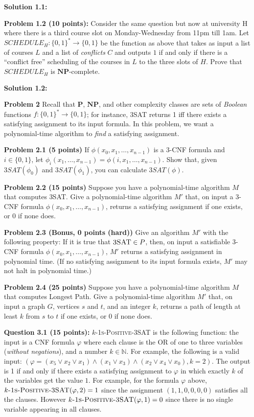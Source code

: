 \documentclass[11pt]{article}
\begin{document}
\textbf{Solution 1.1:}

\textbf{Problem 1.2 (10 points):} Consider the same question but now at
university H where there is a third course slot on Monday-Wednesday from
11pm till 1am. Let \(SCHEDULE_H:\{0,1\}^* \rightarrow \{0,1\}\) be the
function as above that takes as input a list of courses \(L\) and a list
of \emph{conflicts} \(C\) and outputs \(1\) if and only if there is a
``conflict free'' scheduling of the courses in \(L\) to the three slots
of \(H\). Prove that \(SCHEDULE_H\) is \(\mathbf{NP}\)-complete.

\textbf{Solution 1.2:}



\textbf{Problem 2} Recall that $\mathbf{P}$, $\mathbf{NP}$, and other complexity classes are sets of \emph{Boolean} functions $f: \{0,1\}^* \to \{0,1\}$; for instance, 3SAT returns 1 iff there exists a satisfying assignment to its input formula. In this problem, we want a polynomial-time algorithm to \emph{find} a satisfying assignment.

\textbf{Problem 2.1 (5 points)} If $\phi(x_0, x_1, \ldots, x_{n-1})$ is a 3-CNF formula and $i \in \{0,1\}$, let $\phi_i(x_1, \ldots, x_{n-1}) = \phi(i,x_1, \ldots, x_{n-1})$. Show that, given $3SAT(\phi_0)$ and $3SAT(\phi_1)$, you can calculate $3SAT(\phi)$.

\textbf{Problem 2.2 (15 points)} Suppose you have a polynomial-time algorithm $M$ that computes \textsc{3SAT}. Give a polynomial-time algorithm $M'$ that, on input a 3-CNF formula $\phi(x_0, x_1, \ldots, x_{n-1})$, returns a satisfying assignment if one exists, or 0 if none does.

\textbf{Problem 2.3 (Bonus, 0 points (hard))} Give an algorithm $M'$ with the following property: If it is true that $\textsc{3SAT} \in P$, then, on input a satisfiable 3-CNF formula $\phi(x_0, x_1, \ldots, x_{n-1})$, $M'$ returns a satisfying assignment in polynomial time. (If no satisfying assignment to its input formula exists, $M'$ may not halt in polynomial time.)

\textbf{Problem 2.4 (25 points)} Suppose you have a polynomial-time algorithm $M$ that computes Longest Path. Give a polynomial-time algorithm $M'$ that, on input a graph $G$, vertices $s$ and $t$, and an integer $k$, returns a path of length at least $k$ from $s$ to $t$ if one exists, or 0 if none does.


\textbf{Question 3.1 (15 points):} \textsc{$k$-1s-Positive-3SAT} is the following
function: the input is a CNF formula \(\varphi\) where each clause is
the OR of one to three variables (\emph{without negations}), and a
number \(k\in \mathbb{N}\). For example, the following is a valid input:
\(\left(\varphi = (x_5 \vee x_{2} \vee x_1) \wedge (x_1 \vee x_3) \wedge (x_2 \vee x_4 \vee x_0), k = 2\right)\).
The output is 1 if and only if there exists a
satisfying assignment to \(\varphi\) in which exactly \(k\) of the
variables get the value \(1\). For example, for the formula \(\varphi\)
above, \(\textsc{$k$-1s-Positive-3SAT}(\varphi,2)=1\) since the assignment \((1,1,0,0,0,0)\)
satisfies all the clauses. However \(\textsc{$k$-1s-Positive-3SAT}(\varphi,1)=0\) since there is
no single variable appearing in all clauses.
\end{document}
